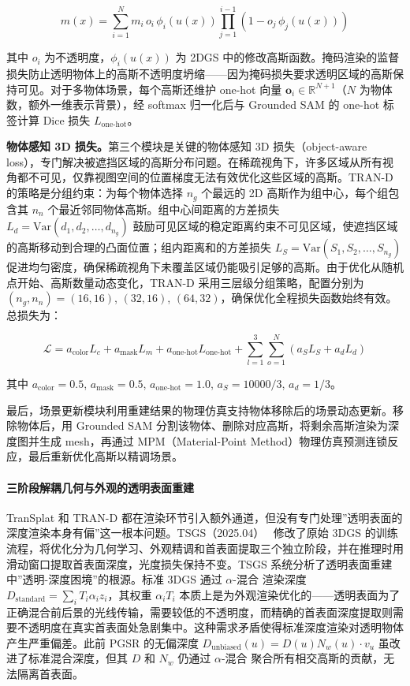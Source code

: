 \begin{equation}
m(x) = \sum_{i=1}^{N} m_i \, o_i \, \phi_i(u(x)) \prod_{j=1}^{i-1}(1 - o_j \, \phi_j(u(x)))
\end{equation}

其中 $o_i$ 为不透明度，$\phi_i(u(x))$ 为 2DGS 中的修改高斯函数。掩码渲染的监督损失防止透明物体上的高斯不透明度坍缩——因为掩码损失要求透明区域的高斯保持可见。对于多物体场景，每个高斯还维护 one-hot 向量 $\mathbf{o}_i \in \mathbb{R}^{N+1}$（$N$ 为物体数，额外一维表示背景），经 softmax 归一化后与 Grounded SAM 的 one-hot 标签计算 Dice 损失 $L_{\text{one-hot}}$。

\textbf{物体感知 3D 损失。}第三个模块是关键的物体感知 3D 损失（object-aware loss），专门解决被遮挡区域的高斯分布问题。在稀疏视角下，许多区域从所有视角都不可见，仅靠视图空间的位置梯度无法有效优化这些区域的高斯。TRAN-D 的策略是分组约束：为每个物体选择 $n_g$ 个最远的 2D 高斯作为组中心，每个组包含其 $n_n$ 个最近邻同物体高斯。组中心间距离的方差损失 $L_d = \text{Var}(d_1, d_2, \ldots, d_{n_g})$ 鼓励可见区域的稳定距离约束不可见区域，使遮挡区域的高斯移动到合理的凸面位置；组内距离和的方差损失 $L_S = \text{Var}(S_1, S_2, \ldots, S_{n_g})$ 促进均匀密度，确保稀疏视角下未覆盖区域仍能吸引足够的高斯。由于优化从随机点开始、高斯数量动态变化，TRAN-D 采用三层级分组策略，配置分别为 $(n_g, n_n) = (16,16)$, $(32,16)$, $(64,32)$，确保优化全程损失函数始终有效。总损失为：

\begin{equation}
\mathcal{L} = a_{\text{color}} L_c + a_{\text{mask}} L_m + a_{\text{one-hot}} L_{\text{one-hot}} + \sum_{l=1}^{3}\sum_{o=1}^{N}(a_S L_S + a_d L_d)
\end{equation}

其中 $a_{\text{color}} = 0.5$, $a_{\text{mask}} = 0.5$, $a_{\text{one-hot}} = 1.0$, $a_S = 10000/3$, $a_d = 1/3$。

最后，场景更新模块利用重建结果的物理仿真支持物体移除后的场景动态更新。移除物体后，用 Grounded SAM 分割该物体、删除对应高斯，将剩余高斯渲染为深度图并生成 mesh，再通过 MPM（Material-Point Method）物理仿真预测连锁反应，最后重新优化高斯以精调场景。

\paragraph{三阶段解耦几何与外观的透明表面重建}

TranSplat 和 TRAN-D 都在渲染环节引入额外通道，但没有专门处理”透明表面的深度渲染本身有偏”这一根本问题。TSGS（2025.04）~\cite{2504_12799} 修改了原始 3DGS 的训练流程，将优化分为几何学习、外观精调和首表面提取三个独立阶段，并在推理时用滑动窗口提取首表面深度，光度损失保持不变。TSGS 系统分析了透明表面重建中”透明-深度困境”的根源。标准 3DGS 通过 $\alpha$-混合 渲染深度 $D_{\text{standard}} = \sum_{i} T_i \alpha_i z_i$，其权重 $\alpha_i T_i$ 本质上是为外观渲染优化的——透明表面为了正确混合前后景的光线传输，需要较低的不透明度，而精确的首表面深度提取则需要不透明度在真实首表面处急剧集中。这种需求矛盾使得标准深度渲染对透明物体产生严重偏差。此前 PGSR 的无偏深度 $D_{\text{unbiased}}(u) = D(u) N_w(u) \cdot v_u$ 虽改进了标准混合深度，但其 $D$ 和 $N_w$ 仍通过 $\alpha$-混合 聚合所有相交高斯的贡献，无法隔离首表面。

